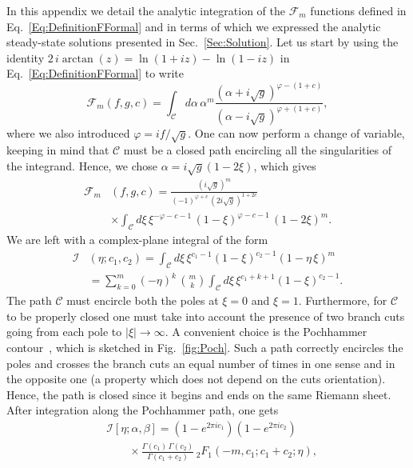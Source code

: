 In this appendix we detail the analytic integration of the ${\mathcal{F}}_m$ functions defined in Eq.~\eqref{Eq:DefinitionFFormal} and in terms of which we expressed the analytic steady-state solutions presented in Sec.~\ref{Sec:Solution}.
Let us start by using the identity $2\, i \arctan(z)=\ln(1+ i  z)-\ln(1- i  z)$ in Eq.~\eqref{Eq:DefinitionFFormal} to write
\begin{equation}
{\mathcal{F}}_m\left(f,g,c\right)=\!\!\int_\mathcal{\!C} d\alpha\,\alpha^m
\frac{\left(\alpha+ i \sqrt{g}\right)^{\varphi-(1+c)}}
{\left(\alpha- i \sqrt{g}\right)^{\varphi+(1+c)}},
\end{equation}
where we also introduced $\varphi= i  f/\sqrt{g}$.
One can now perform a change of variable, keeping in mind that $\mathcal{C}$ must be a closed path encircling all the singularities of the integrand.
Hence, we chose $\alpha= i \sqrt{g}(1-2\xi)$, which gives
\begin{align}
{\mathcal{F}}_m&\left(f,g,c\right)=
\frac{( i \sqrt{g})^m}{(-1)^{\varphi+c}\,(2 i \sqrt{g})^{1+2c}}
\nonumber\\
&\times\int_\mathcal{\!C} d\xi\,\xi^{-\varphi-c-1}\,
(1-\xi)^{\varphi-c-1}\,(1-2\xi)^m.
\end{align}
We are left with a complex-plane integral of the form
\begin{align}\label{Eq:Pochhammer}
\mathcal{I}&(\eta;c_1,c_2)=\int_\mathcal{\!C} d\xi\,
\xi^{c_1-1} (1-\xi)^{c_2-1} (1-\eta\,\xi)^m
\nonumber\\
&=\sum_{k=0}^{m} \left(-\eta\right)^k\, \binom{m}{k}
\int_\mathcal{\!C} d\xi\, \xi^{c_1+k+1} (1-\xi)^{c_2-1}.
\end{align}
The path $\mathcal{C}$ must encircle both the poles at $\xi=0$ and $\xi=1$.
Furthermore, for $\mathcal{C}$ to be properly closed one must take into account the presence of two branch cuts going from each pole to $|\xi|\to\infty$.
A convenient choice is the Pochhammer contour~\cite{MacRobertBOOK}, which is sketched in Fig.~\ref{fig:Poch}.
Such a path correctly encircles the poles and crosses the branch cuts an equal number of times in one sense and in the opposite one (a property which does not depend on the cuts orientation).
Hence, the path is closed since it begins and ends on the same Riemann sheet.
After integration along the Pochhammer path, one gets
\begin{align}
&\mathcal{I}[\eta;\alpha,\beta]
=\left(1-e^{2\pi ic_1}\right)\!\left(1-e^{2\pi ic_2}\right)
\nonumber\\&\qquad\times
\frac{\Gamma\left(c_1\right)\,\Gamma\left(c_2\right)}
{\Gamma\left(c_1+c_2\right)}
\,_2F_1\left(-m,c_1;c_1+c_2;\eta\right),
\end{align}
